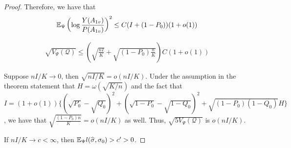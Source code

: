 \begin{proof}
Therefore, we have that
\begin{align*}
{\mathbb E}_{\Psi} \left( \log \frac{Y(A_{1v})}{P(A_{1v})} \right)^2 \leq C (I + (1- P_0))(1 + o(1)) 
\end{align*}

\begin{align*}
\sqrt{ V_{\Psi}( \mathcal{Q}) } \leq \left(\sqrt{\frac{nI}{K}} + \sqrt{ (1 - P_0) \frac{n}{K}} \right) C (1+o(1)) 
\end{align*}

Suppose $nI/K \rightarrow 0$, then $\sqrt{ nI/K} = o(nI/K)$. Under the assumption in the theorem statement that $H = \omega(\sqrt{ K/n })$ and the fact that 
 $I = (1+o(1)) \{ (\sqrt{P_0} - \sqrt{Q_0})^2 +  (\sqrt{1-P_0} - \sqrt{1-Q_0})^2 + \sqrt{(1-P_0)(1-Q_0)}H \}$, we have that $\sqrt{\frac{(1-P_0) n}{K}} = o( nI / K)$ as well. Thus, $\sqrt{ 5 V_{\Psi}(\mathcal{Q})}$ is $o( n I/ K)$. 

If $nI/K \rightarrow c < \infty$, then ${\mathbb E}_{\Psi} l(\widehat{\sigma}, \sigma_0) > c' > 0$. 

\end{proof}











